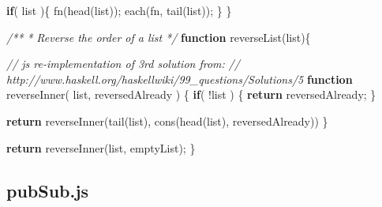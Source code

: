 \documentclass[]{article}
\newenvironment{Shaded}{}{}
\newcommand{\KeywordTok}[1]{\textcolor[rgb]{0.00,0.44,0.13}{\textbf{{#1}}}}
\newcommand{\CommentTok}[1]{\textcolor[rgb]{0.38,0.63,0.69}{\textit{{#1}}}}
\newcommand{\FunctionTok}[1]{\textcolor[rgb]{0.02,0.16,0.49}{{#1}}}
\newcommand{\NormalTok}[1]{{#1}}
\begin{document}
\begin{Shaded}
\begin{Highlighting}[]
   \KeywordTok{if}\NormalTok{( list )\{  }
      \FunctionTok{fn}\NormalTok{(}\FunctionTok{head}\NormalTok{(list));}
      \FunctionTok{each}\NormalTok{(fn, }\FunctionTok{tail}\NormalTok{(list));}
   \NormalTok{\}}
\NormalTok{\}}

\CommentTok{/**}
\CommentTok{ * Reverse the order of a list}
\CommentTok{ */}
\KeywordTok{function} \FunctionTok{reverseList}\NormalTok{(list)\{ }

   \CommentTok{// js re-implementation of 3rd solution from:}
   \CommentTok{//    http://www.haskell.org/haskellwiki/99_questions/Solutions/5}
   \KeywordTok{function} \FunctionTok{reverseInner}\NormalTok{( list, reversedAlready ) \{}
      \KeywordTok{if}\NormalTok{( !list ) \{}
         \KeywordTok{return} \NormalTok{reversedAlready;}
      \NormalTok{\}}
      
      \KeywordTok{return} \FunctionTok{reverseInner}\NormalTok{(}\FunctionTok{tail}\NormalTok{(list), }\FunctionTok{cons}\NormalTok{(}\FunctionTok{head}\NormalTok{(list), reversedAlready))}
   \NormalTok{\}}

   \KeywordTok{return} \FunctionTok{reverseInner}\NormalTok{(list, emptyList);}
\NormalTok{\}}
\end{Highlighting}
\end{Shaded}

\pagebreak

\subsection{pubSub.js}
\end{document}
